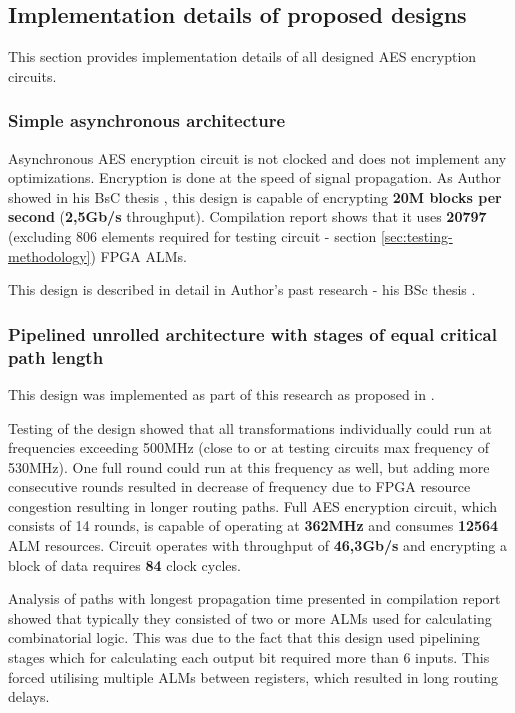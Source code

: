 \subsection{Implementation details of proposed designs}
This section provides implementation details of all designed AES encryption circuits.

\subsubsection{Simple asynchronous architecture}
Asynchronous AES encryption circuit is not clocked and does not implement any optimizations. Encryption is done at the speed of signal propagation. As Author showed in his BsC thesis \cite{inzynierka}, this design is capable of encrypting \textbf{20M blocks per second} (\textbf{2,5Gb/s} throughput). Compilation report shows that it uses \textbf{20797} (excluding 806 elements required for testing circuit - section \ref{sec:testing-methodology}) FPGA ALMs.

This design is described in detail in Author's past research - his BSc thesis \cite{inzynierka}.

\subsubsection{Pipelined unrolled architecture with stages of equal critical path length}

This design was implemented as part of this research as proposed in \cite{vlsi}.

Testing of the design showed that all transformations individually could run at frequencies exceeding 500MHz (close to or at testing circuits max frequency of 530MHz). One full round could run at this frequency as well, but adding more consecutive rounds resulted in decrease of frequency due to FPGA resource congestion resulting in longer routing paths. Full AES encryption circuit, which consists of 14 rounds, is capable of operating at \textbf{362MHz} and consumes \textbf{12564} ALM resources. Circuit operates with throughput of \textbf{46,3Gb/s} and encrypting a block of data requires \textbf{84} clock cycles.

Analysis of paths with longest propagation time presented in compilation report showed that typically they consisted of two or more ALMs used for calculating combinatorial logic. This was due to the fact that this design used pipelining stages which for calculating each output bit required more than 6 inputs. This forced utilising multiple ALMs between registers, which resulted in long routing delays.

